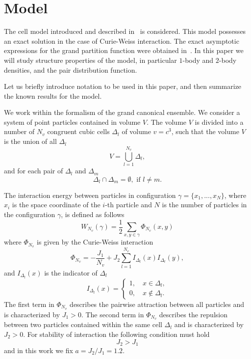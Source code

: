\section{\label{sec:model} Model}
The cell model introduced and described in~\cite{KKD2018book,KKD2020} is considered. This model possesses an exact solution in the case of Curie-Weiss interaction. The exact asymptotic expressions for the grand partition function were obtained in~\cite{KKD2020}. In this paper we will study structure properties of the model, in particular $1$-body and $2$-body densities, and the pair distribution function.

Let us briefly introduce notation to be used in this paper, and then summarize the known results for the model.

We work within the formalism of the grand canonical ensemble. We consider a system of point particles contained in volume $V$. The volume $V$ is divided into a number of $N_v$ congruent cubic cells $\Delta_l$ of volume $v=c^3$, such that the volume $V$ is the union of all $\Delta_l$
\begin{equation*}
	V = \bigcup_{l=1}^{N_v}\Delta_l,
\end{equation*}
and for each pair of $\Delta_l$ and $\Delta_m$
\begin{equation*}
	\Delta_l \cap \Delta_m = \emptyset, \text{ if } l \neq m.
\end{equation*}

The interaction energy between particles in configuration $\gamma = \{x_1, ..., x_N\}$, where $x_i$ is the space coordinate of the $i$-th particle and $N$ is the number of particles in the configuration $\gamma$, is defined as follows
\begin{equation*}
	W_{N_v}(\gamma) = \frac{1}{2} \sum_{x,y \in \gamma} \Phi_{N_v} (x,y)
\end{equation*}
where $\Phi_{N_v}$ is given by the Curie-Weiss interaction
\begin{equation*}
	\Phi_{N_v} = -\frac{J_1}{N_v} + J_2\sum_{l=1}^{N_v} I_{\Delta_l}(x) I_{\Delta_l}(y),
\end{equation*}
and $I_{\Delta_l}(x)$ is the indicator of $\Delta_l$
\begin{equation*}
	I_{\Delta_l} (x) = \left\{
	\begin{array}{ll}
		1, \quad x \in \Delta_l,
		\\
		0, \quad x \notin \Delta_l.
	\end{array}
	\right.
\end{equation*}
The first term in $\Phi_{N_v}$ describes the pairwise attraction between all particles and is characterized by $J_1 > 0$. The second term in $\Phi_{N_v}$ describes the repulsion between two particles contained within the same cell $\Delta_l$ and is characterized by $J_2 > 0.$ For stability of interaction the following condition must hold
\begin{equation*}
	J_2 > J_1
\end{equation*}
and in this work we fix $a = J_2/J_1 = 1.2$.

